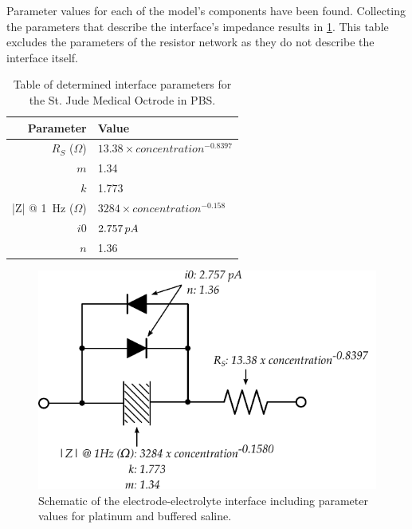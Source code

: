       Parameter values for each of the model's components have been found.
      Collecting the parameters that describe the interface's impedance results in \cref{tab:ModelParameters}.
      This table excludes the parameters of the resistor network as they do not describe the interface itself.

      \begin{table}
        \caption{Table of determined interface parameters for the St. Jude Medical Octrode in PBS.}
        \label{tab:ModelParameters}
        \begin{center}
          \begin{tabular}{r | l}
              Parameter & Value \\
              \hline

              $R_{S}$ ($\Omega$)& $13.38 \times concentration^{-0.8397}$ \\
              
              $m$& 1.34\\
              $k$ & 1.773\\
              |Z| @ \SI{1}{\hertz} ($\Omega$)& $3284 \times concentration^{-0.158}$ \\

              $i0$ & $2.757\thinspace pA$\\
              $n$ & 1.36\\
          \end{tabular}
        \end{center}
      \end{table}

      \begin{figure}
        \centering
        \includegraphics{content/pt2/08-InterfaceParameters/graphics/interfaceSchematic_PBS_Solved}
        \caption{\label{fig:interfaceSchematic_PBS_Solved} Schematic of the electrode-electrolyte interface including parameter values for platinum and buffered saline.}
      \end{figure}

